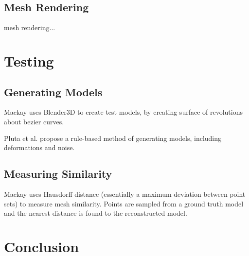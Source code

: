 \documentclass[acmsmall]{acmart}
\begin{document}
\subsection{Mesh Rendering}
mesh rendering...

\section{Testing}
\subsection{Generating Models}

Mackay \cite{mackay2019robust} uses Blender3D to create test models, by creating surface of revolutions about bezier curves. 

Pluta et al. \cite{pluta2012new} propose a rule-based method of generating models, including deformations and noise.

\subsection{Measuring Similarity}

Mackay \cite{mackay2019robust} uses Hausdorff distance (essentially a maximum deviation between point sets) to measure mesh similarity. Points are sampled from a ground truth model and the nearest distance is found to the reconstructed model.

\section{Conclusion}



\end{document}
